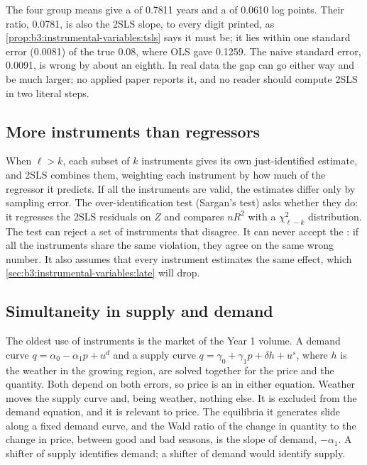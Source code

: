 \label{out:b3:instrumental-variables:tsls}

The four group means give a  of 0.7811 years and a  of
0.0610 log points. Their ratio, 0.0781, is also the 2SLS slope, to every digit
printed, as \cref{prop:b3:instrumental-variables:tsls} says it must be; it lies
within one standard error (0.0081) of the true 0.08, where OLS gave 0.1259.
The naive standard error, 0.0091, is wrong by about an eighth. %
In real data the gap can go either way and be much larger; no applied paper
reports it, and no reader should compute 2SLS in two literal steps.

\subsection*{More instruments than regressors}

When $\ell > k$, each subset of $k$ instruments gives its own just-identified
estimate, and 2SLS combines them, weighting each instrument by how much of the
regressor it predicts. If all the instruments are valid, the estimates differ
only by sampling error. The over-identification test (Sargan's test) asks
whether they do: it regresses the 2SLS residuals on $Z$ and compares $n R^2$
with a $\chi^2_{\ell - k}$ distribution. The test can reject a set of
instruments that disagree. It can never accept the : if
all the instruments share the same violation, they agree on the same wrong
number. It also assumes that every instrument estimates the same effect, which
\cref{sec:b3:instrumental-variables:late} will drop.

\subsection*{Simultaneity in supply and demand}

The oldest use of instruments is the market of the Year 1 volume. A demand
curve $q = \alpha_0 - \alpha_1 p + u^d$ and a supply curve $q = \gamma_0 +
\gamma_1 p + \delta h + u^s$, where $h$ is the weather in the growing region,
are solved together for the price and the quantity. Both depend on both
errors, so price is an  in either equation. Weather moves
the supply curve and, being weather, nothing else. It is excluded from the
demand equation, and it is relevant to price. The equilibria it generates
slide along a fixed demand curve, and the Wald ratio of the change in quantity
to the change in price, between good and bad seasons, is the slope of demand,
$-\alpha_1$. A shifter of supply identifies demand; a shifter of demand would
identify supply.


